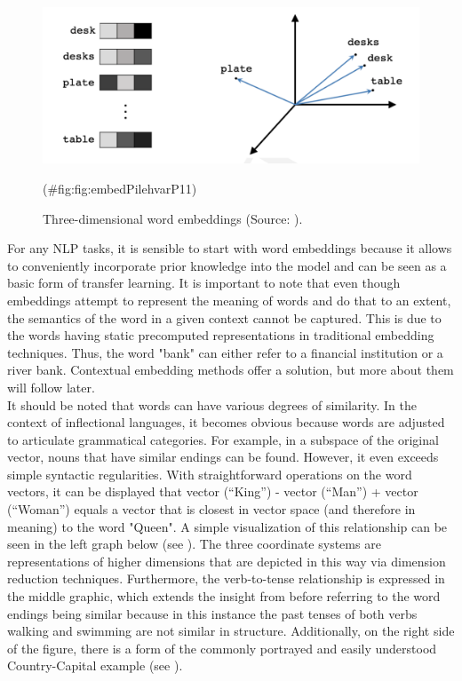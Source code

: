 \documentclass[
]{krantz}
\begin{document}
\begin{figure}

{\centering \includegraphics[width=0.7\linewidth]{./figures/01-01-nlp/embed_pilehvar_p11} 

}

\caption{Three-dimensional word embeddings (Source: \citet{Pilehvar2021}).}(\#fig:fig:embedPilehvarP11)
\end{figure}



For any NLP tasks, it is sensible to start with word embeddings because
it allows to conveniently incorporate prior knowledge into the model and
can be seen as a basic form of transfer learning. It is important to
note that even though embeddings attempt to represent the meaning of
words and do that to an extent, the semantics of the word in a given
context cannot be captured. This is due to the words having static
precomputed representations in traditional embedding techniques. Thus,
the word "bank" can either refer to a financial institution or a river
bank. Contextual embedding methods offer a solution, but more about them
will follow later.\\
It should be noted that words can have various degrees of similarity. In
the context of inflectional languages, it becomes obvious because words
are adjusted to articulate grammatical categories. For example, in a
subspace of the original vector, nouns that have similar endings can be
found. However, it even exceeds simple syntactic regularities. With
straightforward operations on the word vectors, it can be displayed that
vector (``King'') - vector (``Man'') + vector (``Woman'') equals a vector that
is closest in vector space (and therefore in meaning) to the word
"Queen". A simple visualization of this relationship can be seen in
the left graph below (see ). The three coordinate systems are
representations of higher dimensions that are depicted in this way via
dimension reduction techniques. Furthermore, the verb-to-tense
relationship is expressed in the middle graphic, which extends the
insight from before referring to the word endings being similar because
in this instance the past tenses of both verbs walking and swimming are
not similar in structure. Additionally, on the right side of the figure,
there is a form of the commonly portrayed and easily understood
Country-Capital example (see \citep{mikolov2013efficient}).
\end{document}
